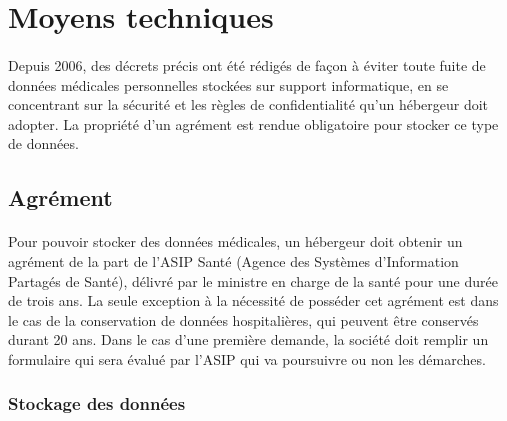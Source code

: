     \section{Moyens techniques}

\paragraph{}
Depuis 2006, des décrets précis ont été rédigés de façon à éviter toute fuite
de données médicales personnelles stockées sur support informatique, en se
concentrant sur la sécurité et les règles de confidentialité qu'un hébergeur
doit adopter. La propriété d'un agrément est rendue obligatoire pour stocker ce
type de données.

        \subsection{Agrément}


\paragraph{}
Pour pouvoir stocker des données médicales, un hébergeur doit obtenir un
agrément de la part de l'ASIP Santé (Agence des Systèmes d'Information Partagés
de Santé), délivré par le ministre en charge de la santé pour une durée de
trois ans. La seule exception à la nécessité de posséder cet agrément est dans
le cas de la conservation de données hospitalières, qui peuvent être conservés
durant 20 ans. Dans le cas d'une première demande, la société doit remplir un
formulaire qui sera évalué par l'ASIP qui va poursuivre ou non les démarches.

            \subsubsection{Stockage des données}

